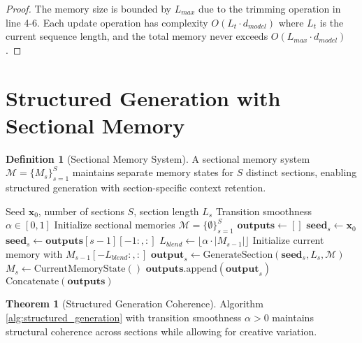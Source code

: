 \documentclass[12pt]{article}
\theoremstyle{definition}
\newtheorem{definition}{Definition}
\newtheorem{theorem}{Theorem}
\begin{document}
\begin{proof}
The memory size is bounded by $L_{max}$ due to the trimming operation in line 4-6. Each update operation has complexity $O(L_t \cdot d_{model})$ where $L_t$ is the current sequence length, and the total memory never exceeds $O(L_{max} \cdot d_{model})$.
\end{proof}

\section{Structured Generation with Sectional Memory}

\begin{definition}[Sectional Memory System]
A sectional memory system $\mathcal{M} = \{M_s\}_{s=1}^S$ maintains separate memory states for $S$ distinct sections, enabling structured generation with section-specific context retention.
\end{definition}

\begin{algorithm}[H]
\caption{Structured Generation with Sectional Memory}
\label{alg:structured_generation}
\begin{algorithmic}[1]
\REQUIRE Seed $\mathbf{x}_0$, number of sections $S$, section length $L_s$
\REQUIRE Transition smoothness $\alpha \in [0,1]$
\STATE Initialize sectional memories $\mathcal{M} = \{\emptyset\}_{s=1}^S$
\STATE $\mathbf{outputs} \leftarrow []$
        \STATE $\mathbf{seed}_s \leftarrow \mathbf{x}_0$
    \ELSE
        \STATE $\mathbf{seed}_s \leftarrow \mathbf{outputs}[s-1][-1:, :]$ 
            \STATE $L_{blend} \leftarrow \lfloor\alpha \cdot |M_{s-1}|\rfloor$
            \STATE Initialize current memory with $M_{s-1}[-L_{blend}:, :]$
        \ENDIF
    \ENDIF
    \STATE $\mathbf{output}_s \leftarrow \text{GenerateSection}(\mathbf{seed}_s, L_s, \mathcal{M})$
    \STATE $M_s \leftarrow \text{CurrentMemoryState}()$
    \STATE $\mathbf{outputs}.\text{append}(\mathbf{output}_s)$
\ENDFOR
\RETURN $\text{Concatenate}(\mathbf{outputs})$
\end{algorithmic}
\end{algorithm}

\begin{theorem}[Structured Generation Coherence]
Algorithm \ref{alg:structured_generation} with transition smoothness $\alpha > 0$ maintains structural coherence across sections while allowing for creative variation.
\end{theorem}
\end{document}
